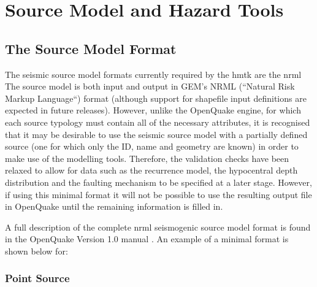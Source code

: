\section{Source Model and Hazard Tools}

\subsection{The Source Model Format}

The seismic source model formats currently required by the hmtk are the nrml  The source model is both input and output in GEM's NRML (``Natural Risk Markup Language``) format (although support for shapefile input definitions are expected in future releases). However, unlike the OpenQuake engine, for which each source typology must contain all of the necessary attributes, it is recognised that it may be desirable to use the seismic source model with a partially defined source (one for which only the ID, name and geometry are known) in order to make use of the modelling tools. Therefore, the validation checks have been relaxed to allow for data such as the recurrence model, the hypocentral depth distribution and the faulting mechanism to be specified at a later stage. However, if using this minimal format it will not be possible to use the resulting output file in OpenQuake until the remaining information is filled in.  

A full description of the complete nrml seismogenic source model format is found in the OpenQuake Version 1.0 manual \parencite{crowley2010}. An example of a minimal format is shown below for:

\subsubsection{Point Source}

